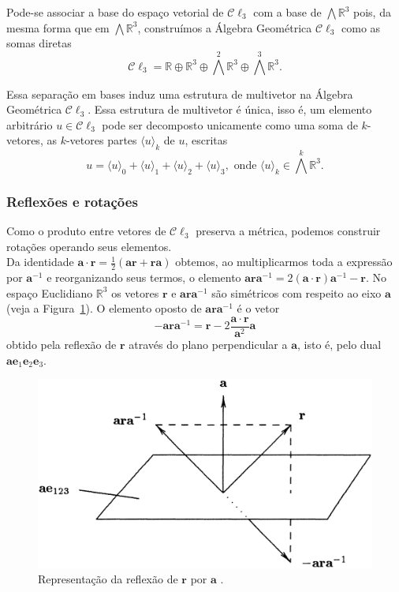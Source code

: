 \documentclass[a4paper,12pt]{report}
\theoremstyle{plain}
\theoremstyle{definition}
\begin{document}
	Pode-se associar a base do espaço vetorial de $\mathcal C \ell_3$ com a base de $\bigwedge\mathbb{R}^3$ pois, da mesma forma que em $\bigwedge\mathbb{R}^3$, construímos a Álgebra Geométrica $\mathcal C \ell_3$ como as somas diretas $$\mathcal C \ell_3 = \mathbb{R} \oplus \mathbb{R}^3\oplus \bigwedge^2\mathbb{R}^3 \oplus \bigwedge^3\mathbb{R}^3.$$
	
	Essa separação em bases induz uma estrutura de multivetor na Álgebra Geométrica $\mathcal C \ell_3$. Essa estrutura de multivetor é única, isso é, um elemento arbitrário $u\in \mathcal C \ell_3$ pode ser decomposto unicamente como uma soma de $k$-vetores, as $k$-vetores partes $\langle u\rangle_k$ de $u$, escritas $$u=\langle u\rangle_0 +\langle u\rangle_1 +\langle u\rangle_2 + \langle u\rangle_3, \text{ onde } \langle u\rangle_k \in \bigwedge^k\mathbb{R}^3.$$
	 
	\subsubsection{Reflexões e rotações}
	Como o produto entre vetores de $\mathcal C \ell_3$ preserva a métrica, podemos construir rotações operando seus elementos. 
	\\
	
	Da identidade $\mathbf a\cdot \mathbf r = \frac 1 2 (\mathbf a\mathbf r + \mathbf r\mathbf a)$ obtemos, ao multiplicarmos toda a expressão por $\mathbf a^{-1}$ e reorganizando seus termos, o elemento $\mathbf a\mathbf r\mathbf a^{-1} = 2(\mathbf a\cdot \mathbf r)\mathbf a^{-1} -\mathbf r$. No espaço Euclidiano $\mathbb{R}^3$ os vetores $\mathbf r$ e $\mathbf a\mathbf r\mathbf a^{-1}$ são simétricos com respeito ao eixo $\mathbf a$ (veja a Figura~\ref{fig:rotacaoCl3}). O elemento oposto de $\mathbf a\mathbf r\mathbf a^{-1}$ é o vetor
	$$-\mathbf a\mathbf r\mathbf a^{-1} = \mathbf r-2\frac{\mathbf a\cdot\mathbf r}{\mathbf a^2}\mathbf a$$ obtido pela reflexão de $\mathbf r$ através do plano perpendicular a $\mathbf a$, isto é, pelo dual $\mathbf a\mathbf e_1\mathbf e_2\mathbf e_3$.
	 
	\begin{figure}[H]
		\begin{center}
			\includegraphics[width=0.6\linewidth]{figures/rotacaoCl3.png}
		\end{center}
		\caption{Representação da reflexão de $\mathbf r$ por $\mathbf a$ \cite{lounestoClifford}.}
		\label{fig:rotacaoCl3}
	\end{figure}
	 
\end{document}
